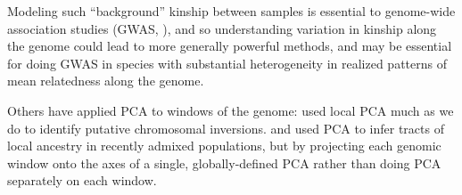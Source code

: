 \documentclass[11pt, oneside]{article}   	%
\newcommand\citet{\cite}
\newcommand\citep{\cite}
\renewcommand{\revpoint}[2]{\relax}
\begin{document}
Modeling such ``background'' kinship between samples
is essential to genome-wide association studies (GWAS, \citet{price2006principal,astle2009population}),
and so understanding variation in kinship along the genome 
could lead to more generally powerful methods,
and may be essential for doing GWAS in species with substantial heterogeneity in realized patterns of mean relatedness along the genome.


Others have applied PCA to windows of the genome:
\citet{ma2012investigation} used local PCA much as we do 
to identify putative chromosomal inversions.
\citet{bryc2010genomewide} and \citet{brisbin2012pcadmix}
used PCA to infer tracts of local ancestry in recently admixed populations,
but by projecting each genomic window onto the axes of a single, globally-defined PCA
rather than doing PCA separately on each window.  \revpoint{1}{7}
\end{document}
